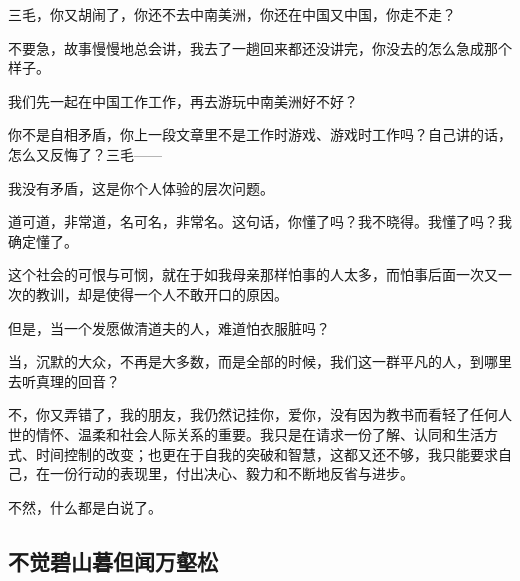 \par 三毛，你又胡闹了，你还不去中南美洲，你还在中国又中国，你走不走？
\par 不要急，故事慢慢地总会讲，我去了一趟回来都还没讲完，你没去的怎么急成那个样子。
\par 我们先一起在中国工作工作，再去游玩中南美洲好不好？
\par 你不是自相矛盾，你上一段文章里不是工作时游戏、游戏时工作吗？自己讲的话，怎么又反悔了？三毛——
\par 我没有矛盾，这是你个人体验的层次问题。
\par 道可道，非常道，名可名，非常名。这句话，你懂了吗？我不晓得。我懂了吗？我确定懂了。
\par 这个社会的可恨与可悯，就在于如我母亲那样怕事的人太多，而怕事后面一次又一次的教训，却是使得一个人不敢开口的原因。
\par 但是，当一个发愿做清道夫的人，难道怕衣服脏吗？
\par 当，沉默的大众，不再是大多数，而是全部的时候，我们这一群平凡的人，到哪里去听真理的回音？
\par 不，你又弄错了，我的朋友，我仍然记挂你，爱你，没有因为教书而看轻了任何人世的情怀、温柔和社会人际关系的重要。我只是在请求一份了解、认同和生活方式、时间控制的改变；也更在于自我的突破和智慧，这都又还不够，我只能要求自己，在一份行动的表现里，付出决心、毅力和不断地反省与进步。
\par 不然，什么都是白说了。


\subsection{不觉碧山暮但闻万壑松}

